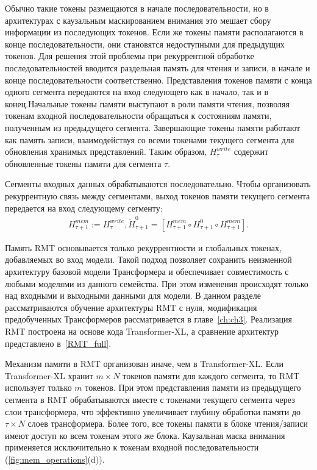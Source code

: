 Обычно такие токены размещаются в начале последовательности, но в архитектурах с каузальным маскированием внимания это мешает сбору информации из последующих токенов. Если же токены памяти располагаются в конце последовательности, они становятся недоступными для предыдущих токенов. Для решения этой проблемы при рекуррентной обработке последовательностей вводится раздельная память для чтения и записи, в начале и конце последовательности соответственно. Представления токенов памяти с конца одного сегмента передаются на вход следующего как в начало, так и в конец.Начальные токены памяти выступают в роли памяти чтения, позволяя токенам входной последовательности обращаться к состояниям памяти, полученным из предыдущего сегмента. Завершающие токены памяти работают как память записи, взаимодействуя со всеми токенами текущего сегмента для обновления хранимых представлений. Таким образом, $H_{\tau}^{write}$ содержит обновленные токены памяти для сегмента $\tau$.

Сегменты входных данных обрабатываются последовательно. Чтобы организовать рекуррентную связь между сегментами, выход токенов памяти текущего сегмента передается на вход следующему сегменту:
\begin{equation*}
\begin{gathered}
H_{\tau+1}^{mem} := H_{\tau}^{write},
\tilde{H}^{0}_{\tau+1} = [H_{\tau+1}^{mem} \circ H_{\tau+1}^0 \circ H_{\tau+1}^{mem}].
\end{gathered}
\end{equation*}



Память RMT основывается только рекуррентности и глобальных токенах, добавляемых во вход модели. Такой подход позволяет сохранить неизменной архитектуру базовой модели Трансформера и обеспечивает совместимость с любыми моделями из данного семейства. При этом изменения происходят только над входными и выходными данными для модели. В данном разделе рассматриваются обучение архитектуры RMT с нуля, модификация предобученных Трансформеров рассматривается в главе~\ref{ch:ch3}. Реализация RMT построена на основе кода Transformer-XL, а сравнение архитектур представлено в~\cref{RMT_full}.

Механизм памяти в RMT организован иначе, чем в Transformer-XL. Если Transformer-XL хранит $m \times N$ токенов памяти для каждого сегмента, то RMT использует только $m$ токенов. При этом представления памяти из предыдущего сегмента в RMT обрабатываются вместе с токенами текущего сегмента через слои трансформера, что эффективно увеличивает глубину обработки памяти до $\tau \times N$ слоев трансформера. Более того, все токены памяти в блоке чтения/записи имеют доступ ко всем токенам этого же блока. Каузальная маска внимания применяется исключительно к токенам входной последовательности (\cref{fig:mem_operations}(d)).

